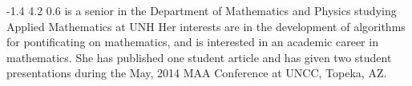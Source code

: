 \documentclass[10pt]{article}
\begin{document}
%
%
\portrait
{-1.4}   %
{4.2}    %
{0.6}    %
%
%
{\Author}
{is a senior in the Department of Mathematics and Physics studying Applied Mathematics at UNH
\Next
Her interests are in the development of algorithms for pontificating on
mathematics, and is interested in an academic career in mathematics.
\Next
She has published one student article and has given two student
presentations during the May, 2014 MAA Conference at UNCC, Topeka, AZ.
}




\EndCol
\end{document}
